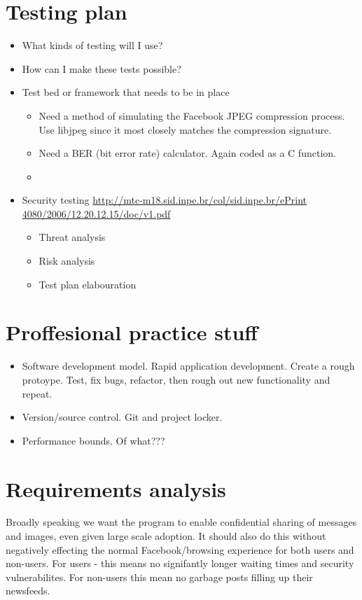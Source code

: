 \section{Testing plan}
    \begin{itemize}
	\item What kinds of testing will I use?
	\item How can I make these tests possible?
	\item Test bed or framework that needs to be in place
        \begin{itemize}
            \item Need a method of simulating the Facebook JPEG compression process. Use libjpeg since it most closely matches the compression signature.
            \item Need a BER (bit error rate) calculator. Again coded as a C function.
            \item 
        \end{itemize}
        \item Security testing \url{http://mtc-m18.sid.inpe.br/col/sid.inpe.br/ePrint 4080/2006/12.20.12.15/doc/v1.pdf}
        \begin{itemize}
            \item Threat analysis
            \item Risk analysis
            \item Test plan elabouration
        \end{itemize}
    \end{itemize}
    
    
\section{Proffesional practice stuff}
    \begin{itemize}
	\item Software development model. Rapid application development. Create a rough protoype. Test, fix bugs, refactor, then rough out new functionality and repeat.
	\item Version/source control. Git and project locker.
	\item Performance bounds. Of what???
    \end{itemize}
    
\section{Requirements analysis}

    Broadly speaking we want the program to enable confidential sharing of messages and images, even given large scale adoption. It should also do this without negatively effecting the normal Facebook/browsing experience for both users and non-users. For users - this means no signifantly longer waiting times and security vulnerabilites. For non-users this mean no garbage posts filling up their newsfeeds.
    
